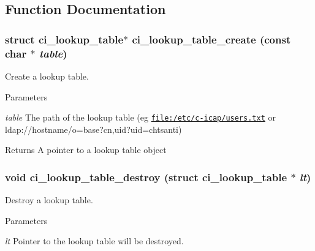 \subsection{Function Documentation}
\hypertarget{group__LOOKUPTABLE_ga849f0e7f5cc543281be8ac236a978006}{
\subsubsection[{ci\_\-lookup\_\-table\_\-create}]{\setlength{\rightskip}{0pt plus 5cm}struct {\bf ci\_\-lookup\_\-table}$\ast$ ci\_\-lookup\_\-table\_\-create (const char $\ast$ {\em table})}}
\label{group__LOOKUPTABLE_ga849f0e7f5cc543281be8ac236a978006}


Create a lookup table. 
\begin{DoxyParams}{Parameters}
\item[{\em table}]The path of the lookup table (eg \href{file:/etc/c-icap/users.txt}{\tt file:/etc/c-\/icap/users.txt} or ldap://hostname/o=base?cn,uid?uid=chtsanti) \end{DoxyParams}
\begin{DoxyReturn}{Returns}
A pointer to a lookup table object 
\end{DoxyReturn}
\hypertarget{group__LOOKUPTABLE_ga8329bdf3b89156854173e4638f75dfb7}{
\subsubsection[{ci\_\-lookup\_\-table\_\-destroy}]{\setlength{\rightskip}{0pt plus 5cm}void ci\_\-lookup\_\-table\_\-destroy (struct {\bf ci\_\-lookup\_\-table} $\ast$ {\em lt})}}
\label{group__LOOKUPTABLE_ga8329bdf3b89156854173e4638f75dfb7}


Destroy a lookup table. 
\begin{DoxyParams}{Parameters}
\item[{\em lt}]Pointer to the lookup table will be destroyed. \end{DoxyParams}

